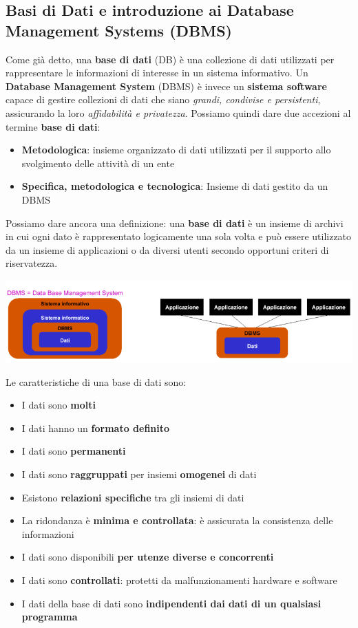 \documentclass[12pt]{article}
\begin{document}
\subsection{Basi di Dati e introduzione ai Database Management Systems (DBMS)}
Come già detto, una \textbf{base di dati} (DB) è una collezione di dati utilizzati per rappresentare le informazioni di interesse in un sistema informativo.
Un \textbf{Database Management System} (DBMS) è invece un \textbf{sistema software} capace di gestire collezioni di dati che siano \textit{grandi, condivise e persistenti}, assicurando la loro \textit{affidabilità e privatezza}.
Possiamo quindi dare due accezioni al termine \textbf{base di dati}:
\begin{itemize}
    \item \textbf{Metodologica}: insieme organizzato di dati utilizzati per il supporto allo svolgimento delle attività di un ente
    \item \textbf{Specifica, metodologica e tecnologica}: Insieme di dati gestito da un DBMS
\end{itemize}
Possiamo dare ancora una definizione: una \textbf{base di dati} è un insieme di archivi in cui ogni dato è rappresentato logicamente
una sola volta e può essere utilizzato da un insieme di applicazioni o da diversi utenti secondo opportuni criteri di riservatezza.
\begin{center}
    \includegraphics[width = 1\textwidth]{Images/2.PNG}
\end{center}
Le caratteristiche di una base di dati sono:
\begin{itemize}
    \item I dati sono \textbf{molti}
    \item I dati hanno un \textbf{formato definito}
    \item I dati sono \textbf{permanenti}
    \item I dati sono \textbf{raggruppati} per insiemi \textbf{omogenei} di dati
    \item Esistono \textbf{relazioni specifiche} tra gli insiemi di dati
    \item La ridondanza è \textbf{minima e controllata}: è assicurata la consistenza delle informazioni
    \item I dati sono disponibili \textbf{per utenze diverse e concorrenti}
    \item I dati sono \textbf{controllati}: protetti da malfunzionamenti hardware e software
    \item I dati della base di dati sono \textbf{indipendenti dai dati di un qualsiasi programma}
\end{itemize}
\end{document}
